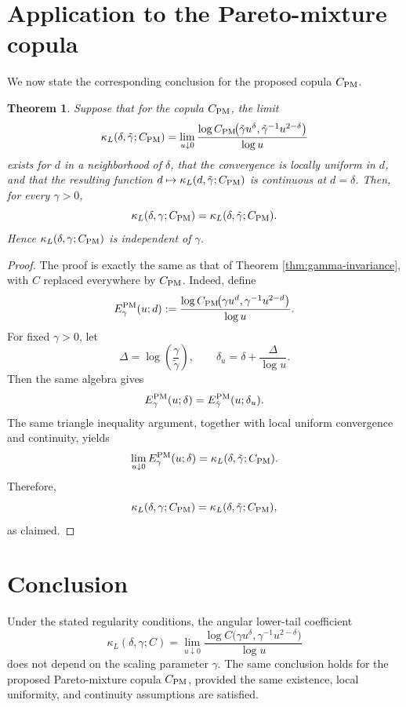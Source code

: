 \documentclass[11pt]{article}
\newtheorem{theorem}{Theorem}
\begin{document}
\section*{Application to the Pareto-mixture copula}

We now state the corresponding conclusion for the proposed copula \(C_{\rm PM}\).

\begin{theorem}\label{thm:pm}
Suppose that for the copula \(C_{\rm PM}\), the limit
\[
\kappa_L(\delta,\tilde\gamma;C_{\rm PM})
=
\lim_{u\downarrow 0}
\frac{\log C_{\rm PM}\!\bigl(\tilde\gamma u^\delta,\tilde\gamma^{-1}u^{2-\delta}\bigr)}{\log u}
\]
exists for \(d\) in a neighborhood of \(\delta\), that the convergence is locally uniform in \(d\), and that the resulting function \(d\mapsto \kappa_L(d,\tilde\gamma;C_{\rm PM})\) is continuous at \(d=\delta\). Then, for every \(\gamma>0\),
\[
\kappa_L(\delta,\gamma;C_{\rm PM})
=
\kappa_L(\delta,\tilde\gamma;C_{\rm PM}).
\]
Hence \(\kappa_L(\delta,\gamma;C_{\rm PM})\) is independent of \(\gamma\).
\end{theorem}

\begin{proof}
The proof is exactly the same as that of Theorem \ref{thm:gamma-invariance}, with \(C\) replaced everywhere by \(C_{\rm PM}\). Indeed, define
\[
E_\gamma^{\rm PM}(u;d)
:=
\frac{\log C_{\rm PM}\!\bigl(\gamma u^d,\gamma^{-1}u^{2-d}\bigr)}{\log u}.
\]
For fixed \(\gamma>0\), let
\[
\Delta=\log\!\left(\frac{\gamma}{\tilde\gamma}\right),
\qquad
\delta_u=\delta+\frac{\Delta}{\log u}.
\]
Then the same algebra gives
\[
E_\gamma^{\rm PM}(u;\delta)=E_{\tilde\gamma}^{\rm PM}(u;\delta_u).
\]
The same triangle inequality argument, together with local uniform convergence and continuity, yields
\[
\lim_{u\downarrow 0}E_\gamma^{\rm PM}(u;\delta)
=
\kappa_L(\delta,\tilde\gamma;C_{\rm PM}).
\]
Therefore,
\[
\kappa_L(\delta,\gamma;C_{\rm PM})
=
\kappa_L(\delta,\tilde\gamma;C_{\rm PM}),
\]
as claimed.
\end{proof}

\section*{Conclusion}

Under the stated regularity conditions, the angular lower-tail coefficient
\[
\kappa_L(\delta,\gamma;C)
=
\lim_{u\downarrow 0}
\frac{\log C\!\bigl(\gamma u^\delta,\gamma^{-1}u^{2-\delta}\bigr)}{\log u}
\]
does not depend on the scaling parameter \(\gamma\). The same conclusion holds for the proposed Pareto-mixture copula \(C_{\rm PM}\), provided the same existence, local uniformity, and continuity assumptions are satisfied.
\end{document}
